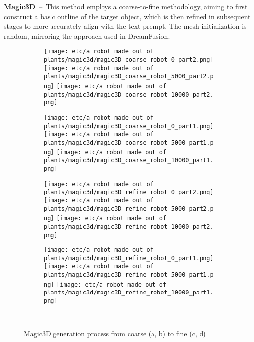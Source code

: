 
\textbf{Magic3D}~--~This method employs a coarse-to-fine methodology, aiming to first construct a basic outline of the target object, which is then refined in subsequent stages to more accurately align with the text prompt. The mesh initialization is random, mirroring the approach used in DreamFusion.

\begin{figure}[H]
    \centering
    \begin{subfigure}[b]{0.15\textwidth}
        \centering
        \fontsize{9pt}{7pt}\selectfont{}\vspace{3cm}
        \fontsize{9pt}{7pt}\selectfont{}\vspace{2.85cm}
        \fontsize{9pt}{7pt}\selectfont{}\vspace{1.95cm}
    \end{subfigure}
    \begin{subfigure}[b]{0.2\textwidth}
        \centering
        \texttt{[image: etc/a robot made out of plants/magic3d/magic3D\_coarse\_robot\_0\_part2.png]}
        \texttt{[image: etc/a robot made out of plants/magic3d/magic3D\_coarse\_robot\_5000\_part2.png]}
        \texttt{[image: etc/a robot made out of plants/magic3d/magic3D\_coarse\_robot\_10000\_part2.png]}
        \caption{}
    \end{subfigure}
    \begin{subfigure}[b]{0.2\textwidth}
        \centering
        \texttt{[image: etc/a robot made out of plants/magic3d/magic3D\_coarse\_robot\_0\_part1.png]}
        \texttt{[image: etc/a robot made out of plants/magic3d/magic3D\_coarse\_robot\_5000\_part1.png]}
        \texttt{[image: etc/a robot made out of plants/magic3d/magic3D\_coarse\_robot\_10000\_part1.png]}
        \caption{}
    \end{subfigure}
    \begin{subfigure}[b]{0.2\textwidth}
        \centering
        \texttt{[image: etc/a robot made out of plants/magic3d/magic3D\_refine\_robot\_0\_part2.png]}
        \texttt{[image: etc/a robot made out of plants/magic3d/magic3D\_refine\_robot\_5000\_part2.png]}
        \texttt{[image: etc/a robot made out of plants/magic3d/magic3D\_refine\_robot\_10000\_part2.png]}
        \caption{}
    \end{subfigure}
    \begin{subfigure}[b]{0.2\textwidth}
        \centering
        \texttt{[image: etc/a robot made out of plants/magic3d/magic3D\_refine\_robot\_0\_part1.png]}
        \texttt{[image: etc/a robot made out of plants/magic3d/magic3D\_refine\_robot\_5000\_part1.png]}
        \texttt{[image: etc/a robot made out of plants/magic3d/magic3D\_refine\_robot\_10000\_part1.png]}
        \caption{}
    \end{subfigure}
    \caption{Magic3D generation process from coarse (a, b) to fine (c, d)}~\label{fig:generationMagic3D}
\end{figure} 

